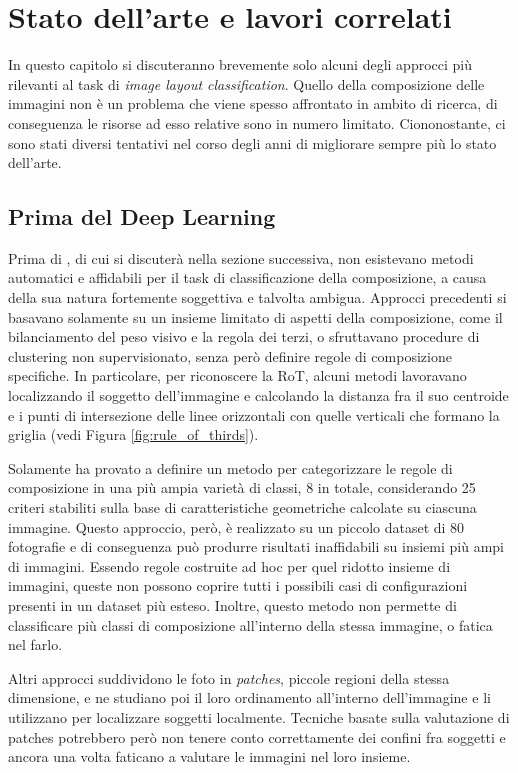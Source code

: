 \chapter{Stato dell'arte e lavori correlati}
\label{sota}
In questo capitolo si discuteranno brevemente solo alcuni degli approcci più rilevanti al task di \textit{image layout classification}. Quello della composizione delle immagini non è un problema che viene spesso affrontato in ambito di ricerca, di conseguenza le risorse ad esso relative sono in numero limitato. Ciononostante, ci sono stati diversi tentativi nel corso degli anni di migliorare sempre più lo stato dell'arte.

\section{Prima del Deep Learning}
Prima di \cite{composition_dominant_geometric}, di cui si discuterà nella sezione successiva, non esistevano metodi automatici e affidabili per il task di classificazione della composizione, a causa della sua natura fortemente soggettiva e talvolta ambigua. Approcci precedenti si basavano solamente su un insieme limitato di aspetti della composizione, come il bilanciamento del peso visivo e la regola dei terzi, o sfruttavano procedure di clustering non supervisionato, senza però definire regole di composizione specifiche. In particolare, per riconoscere la RoT, alcuni metodi lavoravano localizzando il soggetto dell'immagine e calcolando la distanza fra il suo centroide e i punti di intersezione delle linee orizzontali con quelle verticali che formano la griglia (vedi Figura \ref{fig:rule_of_thirds}). 

Solamente \cite{fuzzy2012} ha provato a definire un metodo per categorizzare le regole di composizione in una più ampia varietà di classi, 8 in totale, considerando 25 criteri stabiliti sulla base di caratteristiche geometriche calcolate su ciascuna immagine. Questo approccio, però, è realizzato su un piccolo dataset di 80 fotografie e di conseguenza può produrre risultati inaffidabili su insiemi più ampi di immagini. Essendo regole costruite ad hoc per quel ridotto insieme di immagini, queste non possono coprire tutti i possibili casi di configurazioni presenti in un dataset più esteso. Inoltre, questo metodo non permette di classificare più classi di composizione all'interno della stessa immagine, o fatica nel farlo.

Altri approcci suddividono le foto in \textit{patches}, piccole regioni della stessa dimensione, e ne studiano poi il loro ordinamento all'interno dell'immagine e li utilizzano per localizzare soggetti localmente. Tecniche basate sulla valutazione di patches potrebbero però non tenere conto correttamente dei confini fra soggetti e ancora una volta faticano a valutare le immagini nel loro insieme.

